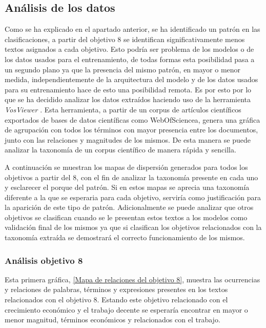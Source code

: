\subsection{Análisis de los datos}
Como se ha explicado en el apartado anterior, se ha identificado un patrón en
las clasificaciones, a partir del objetivo 8 se identifican significativamente
menos textos asignados a cada objetivo. Esto podría ser problema de los modelos
o de los datos usados para el entrenamiento, de todas formas esta posibilidad
pasa a un segundo plano ya que la presencia del mismo patrón, en mayor o menor
medida, independientemente de la arquitectura del modelo y de los datos usados
para su entrenamiento hace de esto una posibilidad remota. Es por esto por lo
que se ha decidido analizar los datos extraídos haciendo uso de la herramienta
\textit{VosViewer} \cite{VOSViewer}. Esta herramienta, a partir de un corpus de
artículos científicos exportados de bases de datos científicas como  \gls{WebOfSciencea}, genera
una gráfica de agrupación con todos los términos con mayor presencia entre los
documentos, junto con las relaciones y magnitudes de los mismos. De esta manera
se puede analizar la taxonomía de un corpus científico de manera rápida y
sencilla. 

A continuación se muestran los mapas de dispersión generados para todos los
objetivos a partir del 8, con el fin de analizar la taxonomía presente en cada
uno y esclarecer el porque del patrón. Si en estos mapas se aprecia una
taxonomía diferente a la que se esperaria para cada objetivo, serviría como
justificación para la aparición de este tipo de patrón. Adicionalmente se puede
analizar que otros objetivos se clasifican cuando se le presentan estos textos a
los modelos como validación final de los mismos ya que si clasifican los
objetivos relacionados con la taxonomía extraída se demostrará el correcto
funcionamiento de los mismos.

\subsubsection{Análisis objetivo 8}
Esta primera gráfica, \cref{Mapa de relaciones del objetivo 8}, muestra las ocurrencias y
relaciones de  palabras, términos y expresiones presentes en los textos
relacionados con el objetivo 8. Estando este objetivo relacionado con el
crecimiento económico y el trabajo decente se esperaría encontrar en mayor o
menor magnitud, términos económicos y relacionados con el trabajo.

